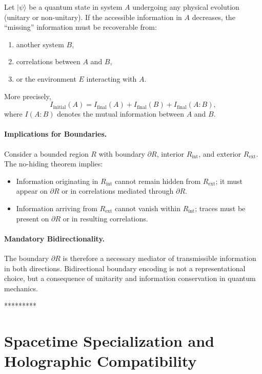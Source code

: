 ﻿\documentclass[12pt]{article}
\begin{document}
\begin{theorem}
Let $|\psi\rangle$ be a quantum state in system $A$ undergoing any physical evolution (unitary or non-unitary). If the accessible information in $A$ decreases, the ``missing'' information must be recoverable from:
\begin{enumerate}
    \item another system $B$,
    \item correlations between $A$ and $B$,
    \item or the environment $E$ interacting with $A$.
\end{enumerate}
More precisely,
\begin{equation}
    I_{\mathrm{initial}}(A) = I_{\mathrm{final}}(A) + I_{\mathrm{final}}(B) + I_{\mathrm{final}}(A:B),
\end{equation}
where $I(A:B)$ denotes the mutual information between $A$ and $B$.
\end{theorem}


\paragraph{Implications for Boundaries.}  
Consider a bounded region $R$ with boundary $\partial R$, interior $R_{\mathrm{int}}$, and exterior $R_{\mathrm{ext}}$. The no-hiding theorem implies:
\begin{itemize}
    \item Information originating in $R_{\mathrm{int}}$ cannot remain hidden from $R_{\mathrm{ext}}$; it must appear on $\partial R$ or in correlations mediated through $\partial R$.
    \item Information arriving from $R_{\mathrm{ext}}$ cannot vanish within $R_{\mathrm{int}}$; traces must be present on $\partial R$ or in resulting correlations.
\end{itemize}


\paragraph{Mandatory Bidirectionality.}  
The boundary $\partial R$ is therefore a necessary mediator of transmissible information in both directions. Bidirectional boundary encoding is not a representational choice, but a consequence of unitarity and information conservation in quantum mechanics.


*********

\section{Spacetime Specialization and Holographic Compatibility}
\end{document}
